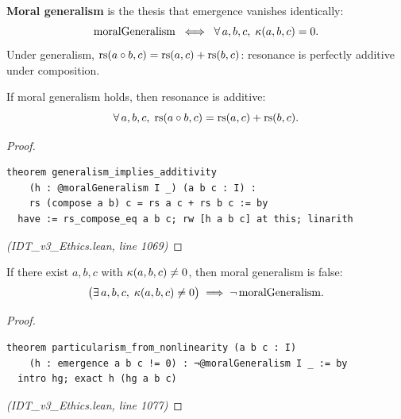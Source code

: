 \begin{definition}
\label{def:moral-generalism}
\textbf{Moral generalism} is the thesis that emergence vanishes identically:
\[
  \mathrm{moralGeneralism} \;\iff\; \forall\, a, b, c,\; \kappa(a, b, c) = 0.
\]
Under generalism, $\mathrm{rs}(a \circ b, c) = \mathrm{rs}(a, c) + \mathrm{rs}(b, c)$: resonance
is perfectly additive under composition.
\end{definition}

\begin{theorem}
\label{thm:generalism-additivity}
If moral generalism holds, then resonance is additive:
\[
  \forall\, a, b, c,\; \mathrm{rs}(a \circ b, c) = \mathrm{rs}(a, c) + \mathrm{rs}(b, c).
\]
\end{theorem}

\begin{proof}
\begin{lstlisting}
theorem generalism_implies_additivity
    (h : @moralGeneralism I _) (a b c : I) :
    rs (compose a b) c = rs a c + rs b c := by
  have := rs_compose_eq a b c; rw [h a b c] at this; linarith
\end{lstlisting}
\textit{(IDT\_v3\_Ethics.lean, line 1069)}
\end{proof}

\begin{theorem}
\label{thm:particularism}
If there exist $a, b, c$ with $\kappa(a, b, c) \neq 0$, then moral
generalism is false:
\[
  \bigl(\exists\, a, b, c,\; \kappa(a, b, c) \neq 0\bigr) \implies
  \neg\, \mathrm{moralGeneralism}.
\]
\end{theorem}

\begin{proof}
\begin{lstlisting}
theorem particularism_from_nonlinearity (a b c : I)
    (h : emergence a b c != 0) : ¬@moralGeneralism I _ := by
  intro hg; exact h (hg a b c)
\end{lstlisting}
\textit{(IDT\_v3\_Ethics.lean, line 1077)}
\end{proof}

